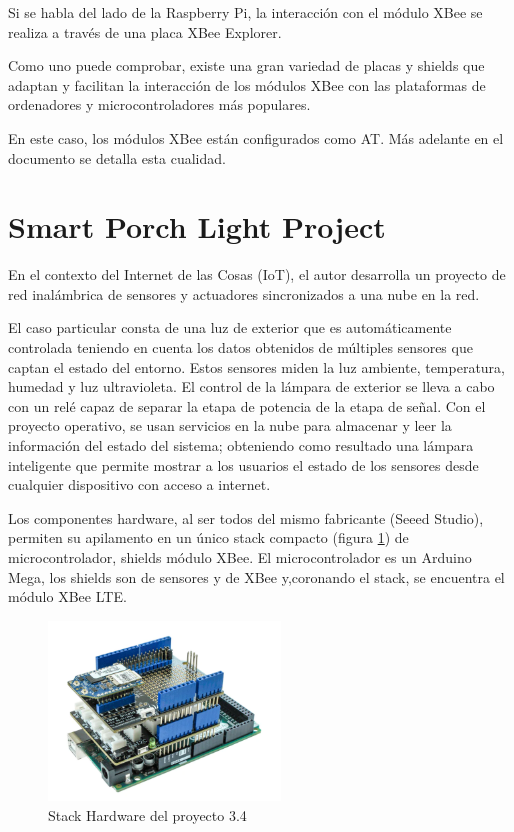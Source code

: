 Si se habla del lado de la Raspberry Pi, la interacción con el módulo XBee se realiza a través de una placa XBee Explorer.

Como uno puede comprobar, existe una gran variedad de placas y shields que adaptan y facilitan la interacción de los módulos XBee con las plataformas de ordenadores y microcontroladores más populares.

En este caso, los módulos XBee están configurados como AT. Más adelante en el documento se detalla esta cualidad.

\section{Smart Porch Light Project \cite{SPLP:Mouser}}

En el contexto del Internet de las Cosas (IoT), el autor desarrolla un proyecto de red inalámbrica de sensores y actuadores sincronizados a una nube en la red.

El caso particular consta de una luz de exterior que es automáticamente controlada teniendo en cuenta los datos obtenidos de múltiples sensores que captan el estado del entorno. Estos sensores miden la luz ambiente, temperatura, humedad y luz ultravioleta. El control de la lámpara de exterior se lleva a cabo con un relé capaz de separar la etapa de potencia de la etapa de señal. Con el proyecto operativo, se usan servicios en la nube para almacenar y leer la información del estado del sistema; obteniendo como resultado una lámpara inteligente que permite mostrar a los usuarios el estado de los sensores desde cualquier dispositivo con acceso a internet.

Los componentes hardware, al ser todos del mismo fabricante (Seeed Studio), permiten su apilamento en un único stack compacto (figura \ref{fig:EArte4}) de microcontrolador, shields módulo XBee. El microcontrolador es un Arduino Mega, los shields son de sensores y de XBee y,coronando el stack, se encuentra el módulo XBee LTE.

\begin{figure}[t]
\centering
\includegraphics[width=0.55\textwidth]{figuras/EArte4.png}
\caption{Stack Hardware del proyecto 3.4}
\label{fig:EArte4}
\end{figure}

